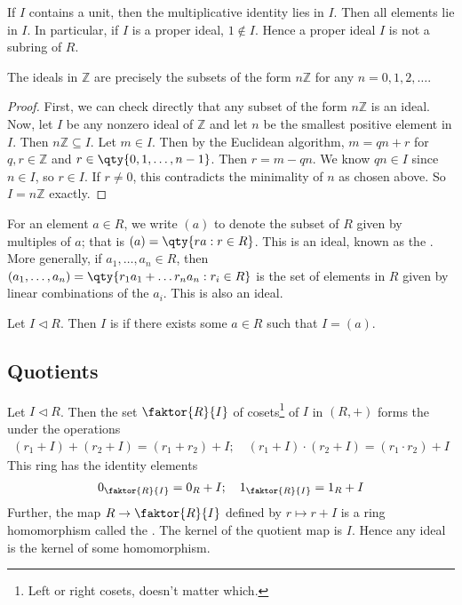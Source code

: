 \begin{remark}
	If $I$ contains a unit, then the multiplicative identity lies in $I$.
	Then all elements lie in $I$.
	In particular, if $I$ is a proper ideal, $1 \not\in I$.
	Hence a proper ideal $I$ is not a subring of $R$.
\end{remark}

\begin{lemma} \label{lem:8.3}
	The ideals in $\mathbb Z$ are precisely the subsets of the form $n\mathbb Z$ for any $n = 0, 1, 2, \dots$.
\end{lemma}

\begin{proof}
	First, we can check directly that any subset of the form $n\mathbb Z$ is an ideal.
	Now, let $I$ be any nonzero ideal of $\mathbb Z$ and let $n$ be the smallest positive element in $I$.
	Then $n\mathbb Z \subseteq I$.
	Let $m \in I$.
	Then by the Euclidean algorithm, $m = qn+r$ for $q,r \in \mathbb Z$ and $r \in \qty{0, 1, \dots, n-1}$.
	Then $r = m - qn$.
	We know $qn \in I$ since $n \in I$, so $r \in I$.
	If $r \neq 0$, this contradicts the minimality of $n$ as chosen above.
	So $I = n\mathbb Z$ exactly.
\end{proof}


\begin{definition}
	For an element $a \in R$, we write $(a)$ to denote the subset of $R$ given by multiples of $a$; that is $(a) = \qty{ra : r\in R}$.
	This is an ideal, known as the .
	More generally, if $a_1, \dots, a_n \in R$, then $(a_1, \dots, a_n) = \qty{r_1 a_1 + \dots r_n a_n : r_i \in R}$ is the set of elements in $R$ given by linear combinations of the $a_i$.
	This is also an ideal.
\end{definition}

\begin{definition}
	Let $I \triangleleft R$.
	Then $I$ is  if there exists some $a \in R$ such that $I = (a)$.
\end{definition}

\subsection{Quotients}
\begin{theorem} \label{thm:8.4}
	Let $I \triangleleft R$.
	Then the set $\faktor{R}{I}$ of cosets\footnote{Left or right cosets, doesn't matter which.} of $I$ in $(R, +)$ forms the  under the operations
	\begin{align*}
		(r_1 + I) + (r_2 + I) = (r_1 + r_2) + I;\quad (r_1 + I) \cdot (r_2 + I) = (r_1 \cdot r_2) + I
	\end{align*}
	This ring has the identity elements
	\begin{align*}
		0_{\faktor{R}{I}} = 0_R + I;\quad 1_{\faktor{R}{I}} = 1_R + I
	\end{align*}
	Further, the map $R \to \faktor{R}{I}$ defined by $r \mapsto r + I$ is a ring homomorphism called the .
	The kernel of the quotient map is $I$.
	Hence any ideal is the kernel of some homomorphism.
\end{theorem}

